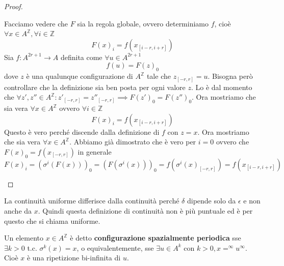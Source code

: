 \begin{teorema} 
\begin{proof}
\begin{itemize}
                  Facciamo vedere che $F$ sia la regola globale, ovvero determiniamo $f$, cioè
                  $\forall x\in A^\mathbb{Z},\forall i\in\mathbb{Z}$
                  $$F(x)_i = f(x_{[i-r,i+r]})$$
                  Sia $f: A^{2r+1}\rightarrow A$ definita come $\forall u \in A^{2r+1}$
                  $$f(u) = F(z)_0$$ dove $z$ è una qualunque configurazione di
                  $A^\mathbb{Z}$ tale che $z_{[-r,r]} = u$. Bisogna però controllare che
                  la definizione sia ben posta per ogni valore $z$. Lo è dal momento che
                  $\forall z',z''\in A^\mathbb{Z}: z'_{[-r,r]} =  z''_{[-r,r]}\implies F(z')_0 = F(z'')_0$.
                  Ora mostriamo che sia vera $\forall x\in A^\mathbb{Z}$ ovvero $\forall i \in \mathbb{Z}$
                  $$F(x)_i = f(x_{[i-r,i+r]})$$
                  Questo è vero perché discende dalla definizione di $f$ con $z = x$.
                  Ora mostriamo che sia vera $\forall x\in A^\mathbb{Z}$. Abbiamo
                  già dimostrato che è vero per $i=0$ ovvero che $F(x)_0 = f(x_{[-r,r]})$
                  in generale 
                  $$F(x)_i = (\sigma^i(F(x)))_0=(F(\sigma^i(x)))_0=f(\sigma^i(x)_{[-r,r]}) = f(x_{[i-r,i+r]})$$
        \end{itemize}
    \end{proof}
\end{teorema}

\begin{nota}
    La continuità uniforme differisce dalla continuità perché $\delta$ dipende 
    solo da $\epsilon$ e non anche da $x$. Quindi questa definizione di continuità non 
    è più puntuale ed è per questo che si chiama uniforme.
\end{nota}

\begin{definizione}
    Un elemento $x\in A^\mathbb{Z}$ è detto \textbf{configurazione spazialmente
        periodica} sse $\exists k>0 $ t.c. $\sigma^k(x) = x$, o equivalentemente, sse
    $\exists u\in A^k$ con $k>0, x = ^\infty u ^\infty$. Cioè $x$ è una ripetizione
    bi-infinita di $u$.
\end{definizione}

